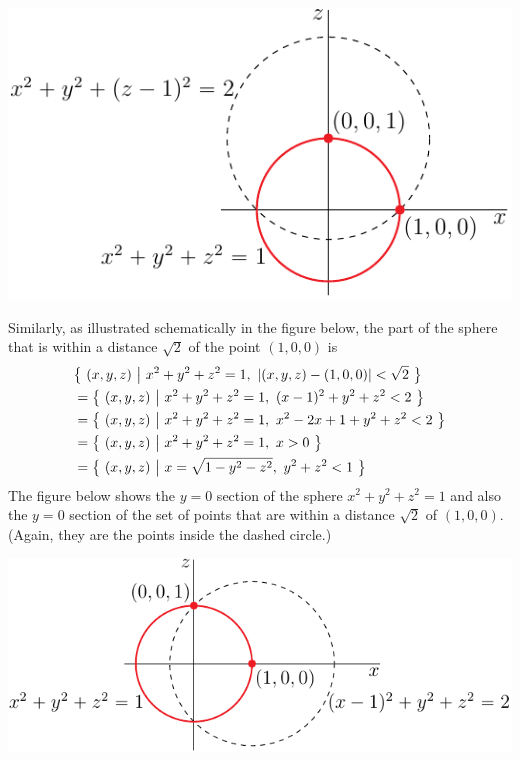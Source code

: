 \begin{eg}[Sphere]
\begin{efig}
\begin{center}
    \includegraphics{localGraphA.pdf}
\end{center}
\end{efig}

Similarly, as illustrated schematically in the figure below,
the part of the sphere that is within a distance
$\sqrt{2}$ of the point $(1,0,0)$ is
\begin{align*}
&\big\{ \ (x,y,z)\ \big|\  x^2+y^2+z^2=1,\ |(x,y,z) - (1,0,0)|<\sqrt{2}\ \big\} \\
&=\big\{ \ (x,y,z)\ \big|\  x^2+y^2+z^2=1,\ (x-1)^2+y^2+z^2 < 2\ \big\} \\
&=\big\{ \ (x,y,z)\ \big|\  x^2+y^2+z^2=1,\ x^2-2x+1+y^2+z^2 < 2\ \big\} \\
&=\big\{ \ (x,y,z)\ \big|\  x^2+y^2+z^2=1,\ x>0\ \big\} \\
&=\big\{ \ (x,y,z)\ \big|\  x=\sqrt{1-y^2-z^2},\ y^2+z^2<1\ \big\}
\end{align*}
The figure below shows the $y=0$ section
of the sphere $x^2+y^2+z^2=1$ and also the $y=0$ section of the set of
points that are within a distance $\sqrt{2}$ of $(1,0,0)$. (Again, they are
the points inside the dashed circle.) 
\begin{efig}
\begin{center}
    \includegraphics{localGraphB.pdf}
\end{center}
\end{efig}


\end{eg}
